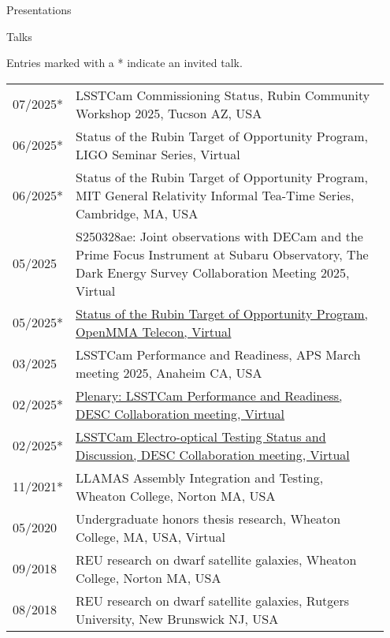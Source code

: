 \documentclass{resume} %
\begin{document}
\begin{rSection}{Presentations}

\begin{rSubsection}{Talks}{}{}{}

Entries marked with a * indicate an invited talk.

    \begin{table}[h]
\begin{tabular}{p{0.07\linewidth} p{0.88\linewidth}}
07/2025* & LSSTCam Commissioning Status, Rubin Community Workshop 2025, Tucson AZ, USA\\
06/2025* & Status of the Rubin Target of Opportunity Program, LIGO Seminar Series, Virtual\\
06/2025* & Status of the Rubin Target of Opportunity Program, MIT General Relativity Informal Tea-Time Series, Cambridge, MA, USA\\
05/2025 & S250328ae: Joint observations with DECam and the Prime Focus Instrument at Subaru Observatory, The Dark Energy Survey Collaboration Meeting 2025, Virtual\\
05/2025* & \href{https://github.com/scimma/openMMA/wiki/Telecon20250522}{Status of the Rubin Target of Opportunity Program, OpenMMA Telecon, Virtual}\\
03/2025 & LSSTCam Performance and Readiness, APS March meeting 2025, Anaheim CA, USA\\
02/2025* & \href{https://docs.google.com/presentation/d/18RmTzV5id9RSE4_1xui-RJvK5FeGknrt8Ro1nBn32nk/edit?usp=sharing}{Plenary: LSSTCam Performance and Readiness, DESC Collaboration meeting, Virtual}\\
02/2025* & \href{https://docs.google.com/presentation/d/12EPsuWSixo40_oqrDPNaXstYnqDzhI_2aFL2hd7IwTE/edit#slide=id.g2ade3bc380_0_0}{LSSTCam Electro-optical Testing Status and Discussion, DESC Collaboration meeting, Virtual}\\
11/2021* & LLAMAS Assembly Integration and Testing, Wheaton College, Norton MA, USA\\
05/2020 & Undergraduate honors thesis research, Wheaton College, MA, USA, Virtual\\ 
09/2018 & REU research on dwarf satellite galaxies, Wheaton College, Norton MA, USA\\
08/2018 & REU research on dwarf satellite galaxies, Rutgers University, New Brunswick NJ, USA\\
\end{tabular}
\end{table}
\end{rSubsection}


\end{rSection}
\end{document}
